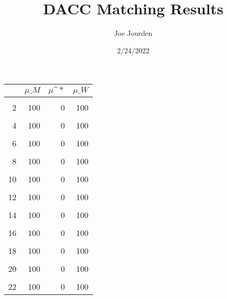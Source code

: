 \documentclass[
]{article}
\title{DACC Matching Results}
\author{Joe Jourden}
\date{2/24/2022}
\begin{document}
\maketitle

\begin{table}[H]
\centering
\begin{tabular}{rrrr}
\toprule
 & $\mu\_M$ & $\mu\^*$ & $\mu\_W$\\
\midrule
\cellcolor{gray!6}{1} & \cellcolor{gray!6}{100} & \cellcolor{gray!6}{0} & \cellcolor{gray!6}{100}\\
2 & 100 & 0 & 100\\
\cellcolor{gray!6}{3} & \cellcolor{gray!6}{100} & \cellcolor{gray!6}{0} & \cellcolor{gray!6}{100}\\
4 & 100 & 0 & 100\\
\cellcolor{gray!6}{5} & \cellcolor{gray!6}{100} & \cellcolor{gray!6}{0} & \cellcolor{gray!6}{100}\\
6 & 100 & 0 & 100\\
\cellcolor{gray!6}{7} & \cellcolor{gray!6}{100} & \cellcolor{gray!6}{0} & \cellcolor{gray!6}{100}\\
8 & 100 & 0 & 100\\
\cellcolor{gray!6}{9} & \cellcolor{gray!6}{100} & \cellcolor{gray!6}{0} & \cellcolor{gray!6}{100}\\
10 & 100 & 0 & 100\\
\cellcolor{gray!6}{11} & \cellcolor{gray!6}{100} & \cellcolor{gray!6}{0} & \cellcolor{gray!6}{100}\\
12 & 100 & 0 & 100\\
\cellcolor{gray!6}{13} & \cellcolor{gray!6}{100} & \cellcolor{gray!6}{0} & \cellcolor{gray!6}{100}\\
14 & 100 & 0 & 100\\
\cellcolor{gray!6}{15} & \cellcolor{gray!6}{100} & \cellcolor{gray!6}{0} & \cellcolor{gray!6}{100}\\
16 & 100 & 0 & 100\\
\cellcolor{gray!6}{17} & \cellcolor{gray!6}{100} & \cellcolor{gray!6}{0} & \cellcolor{gray!6}{100}\\
18 & 100 & 0 & 100\\
\cellcolor{gray!6}{19} & \cellcolor{gray!6}{100} & \cellcolor{gray!6}{0} & \cellcolor{gray!6}{100}\\
20 & 100 & 0 & 100\\
\cellcolor{gray!6}{21} & \cellcolor{gray!6}{100} & \cellcolor{gray!6}{0} & \cellcolor{gray!6}{100}\\
22 & 100 & 0 & 100\\

\end{tabular}
\end{table}
\end{document}
